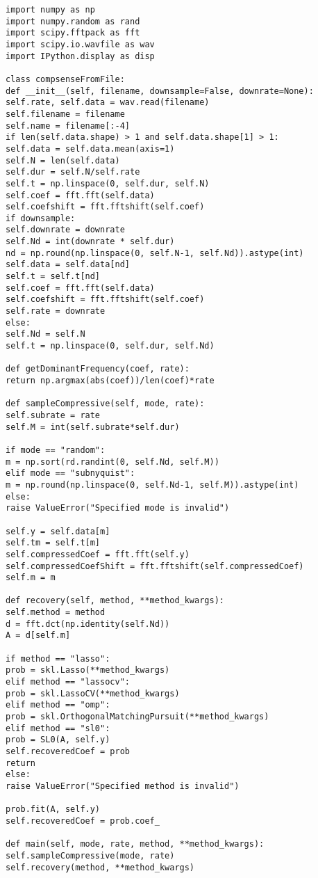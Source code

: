 \begin{lstlisting}
import numpy as np
import numpy.random as rand
import scipy.fftpack as fft
import scipy.io.wavfile as wav
import IPython.display as disp

class compsenseFromFile:
def __init__(self, filename, downsample=False, downrate=None):
self.rate, self.data = wav.read(filename)
self.filename = filename
self.name = filename[:-4]
if len(self.data.shape) > 1 and self.data.shape[1] > 1:
self.data = self.data.mean(axis=1)
self.N = len(self.data)
self.dur = self.N/self.rate
self.t = np.linspace(0, self.dur, self.N)
self.coef = fft.fft(self.data)
self.coefshift = fft.fftshift(self.coef)
if downsample:
self.downrate = downrate
self.Nd = int(downrate * self.dur)
nd = np.round(np.linspace(0, self.N-1, self.Nd)).astype(int)
self.data = self.data[nd]
self.t = self.t[nd]
self.coef = fft.fft(self.data)
self.coefshift = fft.fftshift(self.coef)
self.rate = downrate
else:
self.Nd = self.N
self.t = np.linspace(0, self.dur, self.Nd)

def getDominantFrequency(coef, rate):
return np.argmax(abs(coef))/len(coef)*rate

def sampleCompressive(self, mode, rate):
self.subrate = rate
self.M = int(self.subrate*self.dur)

if mode == "random":
m = np.sort(rd.randint(0, self.Nd, self.M))
elif mode == "subnyquist":
m = np.round(np.linspace(0, self.Nd-1, self.M)).astype(int)
else:
raise ValueError("Specified mode is invalid")

self.y = self.data[m]
self.tm = self.t[m]
self.compressedCoef = fft.fft(self.y)
self.compressedCoefShift = fft.fftshift(self.compressedCoef)
self.m = m

def recovery(self, method, **method_kwargs):
self.method = method
d = fft.dct(np.identity(self.Nd))
A = d[self.m]

if method == "lasso":
prob = skl.Lasso(**method_kwargs)
elif method == "lassocv":
prob = skl.LassoCV(**method_kwargs)
elif method == "omp":
prob = skl.OrthogonalMatchingPursuit(**method_kwargs)
elif method == "sl0":
prob = SL0(A, self.y)
self.recoveredCoef = prob
return
else:
raise ValueError("Specified method is invalid")

prob.fit(A, self.y)
self.recoveredCoef = prob.coef_

def main(self, mode, rate, method, **method_kwargs):
self.sampleCompressive(mode, rate)
self.recovery(method, **method_kwargs)
\end{lstlisting}


